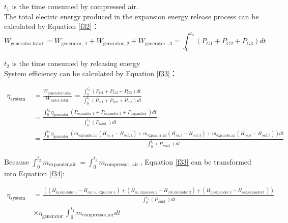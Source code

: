 \documentclass[journal,onecolumn]{IEEEtran}
\begin{document}
$ t_1 $ is the time consumed by compressed air.\\

The total electric energy produced in the expansion energy release process can be calculated by Equation \ref{f32}：
\begin{equation}\label{f32}
	W_{\text {generator,total }}=W_{\text {generator, } 1}+W_{\text {generator, } 2}+W_{\text {generator }, 3}=\int_{0}^{t_{2}}\left(P_{G 1}+P_{G 2}+P_{G 3}\right) d t
\end{equation}

$ t_2 $ is the time consumed by releasing energy\\

System efficiency can be calculated by Equation \ref{f33}：


\begin{equation}\label{f33}
		\begin{aligned}
		\eta_{\text {system }}&=\frac{W_{\text {generator,total }}}{W_{\text {motor,total }}}=\frac{\int_{0}^{t_{2}}\left(P_{G 1}+P_{G 2}+P_{G 3}\right) d t}{\int_{0}^{t_{1}}\left(P_{m 1}+P_{m 2}+P_{m 3}\right) d t}
		\\
		&=\frac{\int_{0}^{t_{2}} \eta_{\text {generator }}\left(P_{\text {expander } 1}+P_{\text {expander } 2}+P_{\text {expanders }}\right) d t}{\int_{0}^{t_{1}}\left(P_{\text {wind }}\right) d t}\\
		&=\frac{\int_{0}^{t_{2}} \eta_{\text {generator }}\left(m_{\text {expander,air} }(H_{in,4}-H_{out,4})+m_{\text {expander,air} }(H_{in,5}-H_{out,5})+m_{\text {expander,air} }(H_{in,6}-H_{out,6})\right) d t}{\int_{0}^{t_{1}}\left(P_{\text {wind }}\right) d t}
	\end{aligned}
\end{equation}


Because $\int_{0}^{t_{2}} m_{\text {expander,air }}=\int_{0}^{t_{1}} m_{\text {compressor, air }}  $, Equation \ref{f33} can be transformed into Equation \ref{f34}:

\begin{equation}\label{f34}
	\begin{aligned}
		\eta_{\text {system }}&=\frac{\left(\left(H_{\text {in,expander } 1}-H_{\text {out } 4, \text { expander } 1}\right)+\left(H_{\text {in, expander } 2}-H_{\text {out,expander } 2}\right)+\left(H_{\text {in,expander } 3}-H_{\text {out,expander3 }}\right)\right) }{\int_{0}^{t_{1}}\left(P_{\text {wind }}\right) d t}\\ 
		&\times \eta_{\text {generator }} \int_{0}^{t_{1}} m_{\text {compressor,air}} d t
	\end{aligned}
\end{equation}
\end{document}
